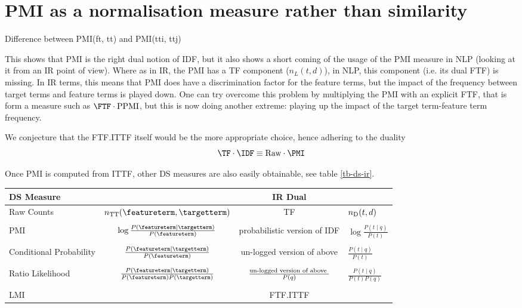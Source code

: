 \appendix

\section{PMI as a normalisation measure rather than similarity}

Difference between PMI(ft, tt) and PMI(tti, ttj)


This  shows  that PMI is  the right dual notion of IDF, but  it also shows a short coming of the usage of the PMI measure  in NLP   (looking at it from an IR point of view). Where as in IR, the PMI has a TF component ($n_L(t,d)$), in NLP, this component (i.e. its dual  FTF) is missing.   In IR terms, this means that PMI does have a  discrimination factor for the feature terms, but the impact of the  frequency between target terms and feature terms is played down.  One can try overcome this problem by  multiplying the PMI with an explicit FTF, that is form a measure such as $\FTF \cdot \textmd{PPMI}$, but this is now doing another extreme: playing up the impact of the target term-feature term frequency.  

 We conjecture that  the FTF.ITTF itself would be the more appropriate choice, hence adhering to the duality
 \[
\TF \cdot \IDF \equiv \textmd{Raw} \cdot \PMI
\]

Once PMI is computed from ITTF, other DS measures are also easily obtainable, see  table \ref{tb-ds-ir}.
 
\begin{figure*}[htb]
  \centering
  \begin{tabular}{|l|c|c|l|}
  \hline
  DS Measure  && IR Dual &\\
  \hline
 Raw Counts  &$n_{\textmd{TT}}(\featureterm,\targetterm)$ & TF &$n_{\textmd{D}}(t,d)$\\
 &&&\\
 PMI & $\log{\frac{P(\featureterm \mid \targetterm)}{P(\featureterm)}}$  &  probabilistic version of IDF  &$\log{\frac{P(t \mid q)}{P(t)}}$\\
 &&&\\
 Conditional Probability &$ \frac{P(\featureterm \mid \targetterm)}{P(\featureterm)}$ &  un-logged version of above  &$\frac{P(t\mid q)}{P(t)}$ \\
  &&&\\
  Ratio Likelihood & $\frac{P(\featureterm \mid \targetterm)}{P(\featureterm)P(\targetterm)}$ & $\frac{\textmd{un-logged version of above }}{P(q)}$ & $\frac{P(t \mid q)}{P(t) P(q)}$ \\
 &&&\\
 LMI && FTF.ITTF&\\
  \hline
  \end{tabular}
  \caption{Nothing}
  \label{tb-ds-ir}
\end{figure*}



